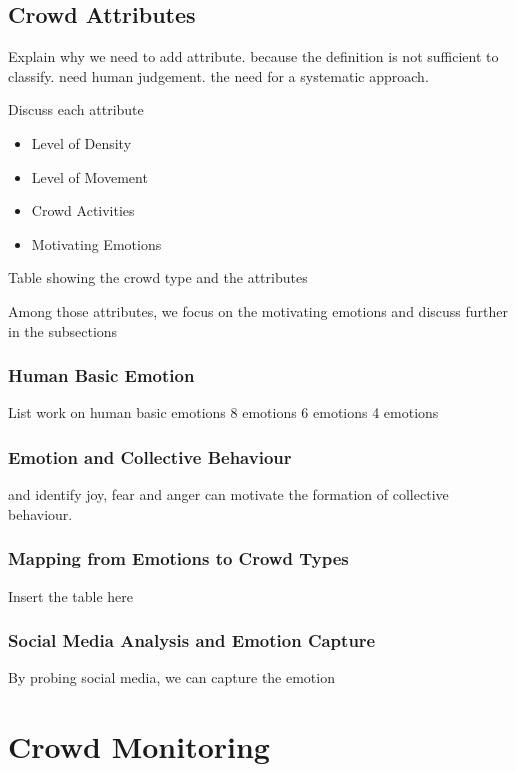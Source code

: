 \subsection{Crowd Attributes}
Explain why we need to add attribute. because the definition is not sufficient to classify. need human judgement. the need for a systematic approach.

Discuss each attribute
\begin{itemize}
\item Level of Density
\item Level of Movement
\item Crowd Activities
\item Motivating Emotions
\end{itemize}

Table showing the crowd type and the attributes

Among those attributes, we focus on the motivating emotions and discuss further in the subsections

\subsubsection{Human Basic Emotion}
List work on human basic emotions
8 emotions
6 emotions
4 emotions
\subsubsection{Emotion and Collective Behaviour}
\citet{Lofland1985} and \citet{Smelser1998} identify joy, fear and anger can motivate the formation of collective behaviour. 

\subsubsection{Mapping from Emotions to Crowd Types}
Insert the table here

\subsubsection{Social Media Analysis and Emotion Capture}
By probing social media, we can capture the emotion

\section{Crowd Monitoring}